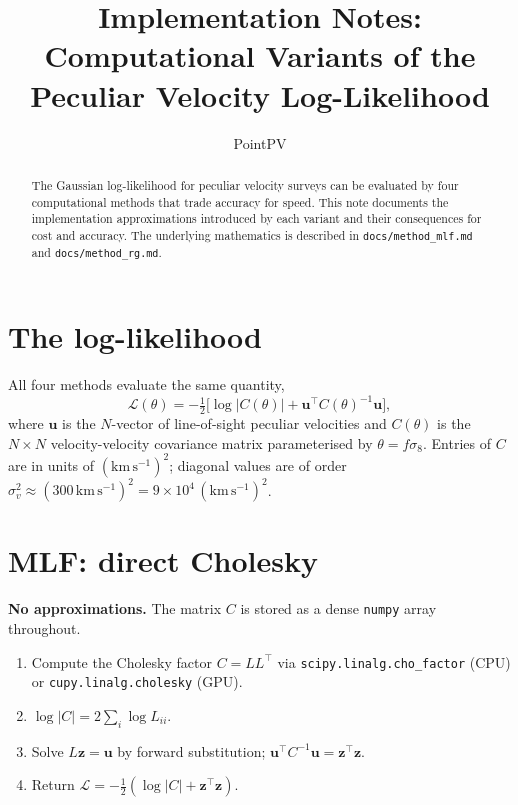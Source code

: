 \documentclass[11pt]{article}
\title{Implementation Notes: Computational Variants of the\\
       Peculiar Velocity Log-Likelihood}
\author{PointPV}
\date{}
\begin{document}
\maketitle

\begin{abstract}
The Gaussian log-likelihood for peculiar velocity surveys can be evaluated
by four computational methods that trade accuracy for speed.
This note documents the implementation approximations introduced by each
variant and their consequences for cost and accuracy.
The underlying mathematics is described in \texttt{docs/method\_mlf.md}
and \texttt{docs/method\_rg.md}.
\end{abstract}

\section{The log-likelihood}

All four methods evaluate the same quantity,
\begin{equation}
  \mathcal{L}(\theta)
  = -\tfrac{1}{2}\bigl[\log|C(\theta)| + \mathbf{u}^\top C(\theta)^{-1}\mathbf{u}\bigr],
\end{equation}
where $\mathbf{u}$ is the $N$-vector of line-of-sight peculiar velocities
and $C(\theta)$ is the $N\times N$ velocity-velocity covariance matrix
parameterised by $\theta = f\sigma_8$.
Entries of $C$ are in units of $(\mathrm{km\,s^{-1}})^2$; diagonal
values are of order $\sigma_v^2 \approx (300\,\mathrm{km\,s^{-1}})^2
= 9\times 10^4\,(\mathrm{km\,s^{-1}})^2$.

\section{MLF: direct Cholesky}

\textbf{No approximations.}
The matrix $C$ is stored as a dense \texttt{numpy} array throughout.

\begin{enumerate}
  \item Compute the Cholesky factor $C = LL^\top$ via
        \texttt{scipy.linalg.cho\_factor} (CPU) or
        \texttt{cupy.linalg.cholesky} (GPU).
  \item $\log|C| = 2\sum_i \log L_{ii}$.
  \item Solve $L\mathbf{z} = \mathbf{u}$ by forward substitution;
        $\mathbf{u}^\top C^{-1}\mathbf{u} = \mathbf{z}^\top\mathbf{z}$.
  \item Return $\mathcal{L} = -\tfrac{1}{2}(\log|C| + \mathbf{z}^\top\mathbf{z})$.
\end{enumerate}
\end{document}
